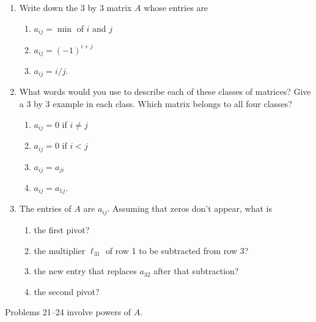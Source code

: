 \documentclass[14pt, a4paper]{article}
\begin{document}
\begin{enumerate}[resume]

    \item Write down the 3 by 3 matrix $A$ whose entries are
          \begin{enumerate}
              \item $a_{ij} = \min$ of $i$ and $j$
              \item $a_{ij} = (-1)^{i+j}$
              \item $a_{ij} = i/j$.
          \end{enumerate}

    \item What words would you use to describe each of these classes of matrices? Give a 3 by 3 example in each class. Which matrix belongs to all four classes?
          \begin{enumerate}
              \item $a_{ij} = 0$ if $i \ne j$
              \item $a_{ij} = 0$ if $i < j$
              \item $a_{ij} = a_{ji}$
              \item $a_{ij} = a_{1j}$.
          \end{enumerate}

    \item The entries of $A$ are $a_{ij}$. Assuming that zeros don't appear, what is
          \begin{enumerate}
              \item the first pivot?
              \item the multiplier $\ell_{31}$ of row 1 to be subtracted from row 3?
              \item the new entry that replaces $a_{32}$ after that subtraction?
              \item the second pivot?
          \end{enumerate}
\end{enumerate}

\noindent  Problems 21--24 involve powers of $A$.
\end{document}
